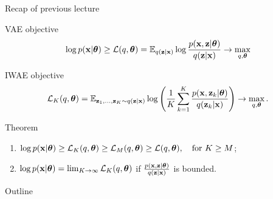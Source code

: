 \begin{frame}{Recap of previous lecture}
	\begin{block}{VAE objective}
		\vspace{-0.2cm}
		\[
		\log p(\mathbf{x} | \boldsymbol{\theta}) \geq \mathcal{L} (q, \boldsymbol{\theta})  = \mathbb{E}_{q(\mathbf{z} | \mathbf{x})} \log \frac{p(\mathbf{x}, \mathbf{z} | \boldsymbol{\theta})}{q(\mathbf{z}| \mathbf{x})} \rightarrow \max_{q, \boldsymbol{\theta}}
		\]
		\vspace{-0.2cm}
	\end{block}
	\begin{block}{IWAE objective}
		\vspace{-0.4cm}
		\[
		\mathcal{L}_K (q, \boldsymbol{\theta})  = \mathbb{E}_{\mathbf{z}_1, \dots, \mathbf{z}_K \sim q(\mathbf{z} | \mathbf{x})} \log \left( \frac{1}{K}\sum_{k=1}^K\frac{p(\mathbf{x}, \mathbf{z}_k | \boldsymbol{\theta})}{q(\mathbf{z}_k| \mathbf{x})} \right) \rightarrow \max_{q, \boldsymbol{\theta}}.
		\]
		\vspace{-0.4cm}
	\end{block}
	\begin{block}{Theorem}
		\begin{enumerate}
			\item $\log p(\mathbf{x} | \boldsymbol{\theta}) \geq \mathcal{L}_K (q, \boldsymbol{\theta}) \geq \mathcal{L}_M (q, \boldsymbol{\theta}) \geq \mathcal{L} (q, \boldsymbol{\theta}), \quad \text{for } K \geq M$;
			\item $\log p(\mathbf{x} | \boldsymbol{\theta}) = \lim_{K \rightarrow \infty} \mathcal{L}_K (q, \boldsymbol{\theta})$ if $\frac{p(\mathbf{x}, \mathbf{z} | \boldsymbol{\theta})}{q(\mathbf{z} | \mathbf{x})}$ is bounded.
		\end{enumerate}
	\end{block}
\end{frame}
\begin{frame}{Outline}
	\tableofcontents
\end{frame}
